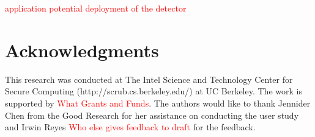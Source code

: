 \documentclass{soups}
\begin{document}
\textcolor{red}{application potential deployment of the detector}



\section{Acknowledgments}
This research was conducted at The Intel Science and Technology Center for Secure Computing (http://scrub.cs.berkeley.edu/) at UC Berkeley. The work is supported by \textcolor{red}{What Grants and Funds}. The authors would like to thank Jennider Chen from the Good Research for her assistance on conducting the user study and Irwin Reyes \textcolor{red}{Who else gives feedback to draft} for the feedback.




%













\end{document}
